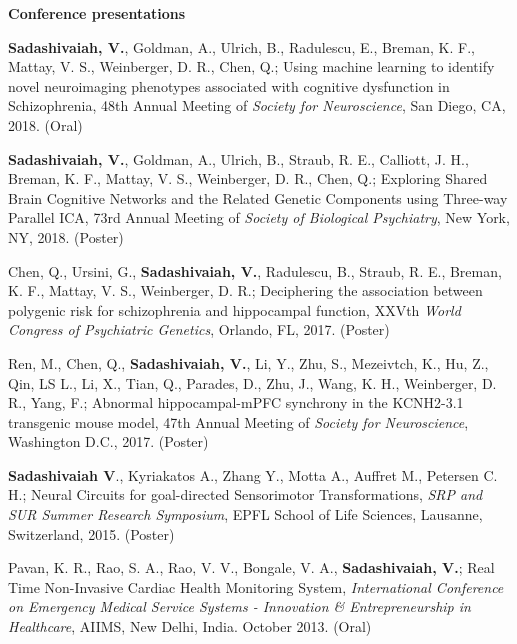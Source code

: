 \documentclass{resume}
\begin{document}
\textbf{Conference presentations}
\begin{presentations}
\item \textbf{Sadashivaiah, V.}, Goldman, A., Ulrich, B., Radulescu, E., Breman, K. F., Mattay, V. S., Weinberger, D. R., Chen, Q.; Using machine learning to identify novel neuroimaging phenotypes associated with cognitive dysfunction in Schizophrenia, 48th Annual Meeting of \textit{Society for Neuroscience}, San Diego, CA, 2018. (Oral)

\item \textbf{Sadashivaiah, V.}, Goldman, A., Ulrich, B., Straub, R. E., Calliott, J. H., Breman, K. F., Mattay, V. S., Weinberger, D. R., Chen, Q.; Exploring Shared Brain Cognitive Networks and the Related Genetic Components using Three-way Parallel ICA, 73rd Annual Meeting of \textit{Society of Biological Psychiatry}, New York, NY, 2018. (Poster) 

\item Chen, Q., Ursini, G., \textbf{Sadashivaiah, V.}, Radulescu, B., Straub, R. E., Breman, K. F., Mattay, V. S., Weinberger, D. R.; Deciphering the association between polygenic risk for schizophrenia and hippocampal function, XXVth \textit{World Congress of Psychiatric Genetics}, Orlando, FL, 2017. (Poster)

\item Ren, M., Chen, Q., \textbf{Sadashivaiah, V.}, Li, Y., Zhu, S., Mezeivtch, K., Hu, Z.,  Qin, LS L., Li, X., Tian, Q., Parades, D., Zhu, J., Wang, K. H., Weinberger, D. R., Yang, F.; Abnormal hippocampal-mPFC synchrony in the KCNH2-3.1 transgenic mouse model, 47th Annual Meeting of \textit{Society for Neuroscience}, Washington D.C., 2017. (Poster)

\item \textbf{Sadashivaiah V}.,  Kyriakatos A.,  Zhang Y.,  Motta A.,  Auffret M.,  Petersen C. H.; Neural Circuits for goal-directed Sensorimotor Transformations, \textit{SRP and SUR Summer Research Symposium}, EPFL School of Life Sciences, Lausanne, Switzerland, 2015. (Poster)

\item Pavan, K. R., Rao, S. A., Rao, V. V., Bongale, V. A., \textbf{Sadashivaiah, V.}; Real Time Non-Invasive Cardiac Health Monitoring System,  \textit{International Conference on Emergency Medical Service Systems - Innovation \& Entrepreneurship in Healthcare}, AIIMS, New Delhi, India. October 2013. (Oral)
\end{presentations}

\vspace{1em}
\end{document}
